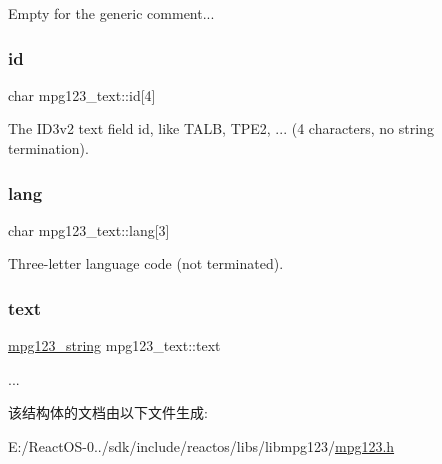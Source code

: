 Empty for the generic comment... \mbox{\label{structmpg123__text_a8a75ed97a1d8a019a3944935c1339fdb}} 
\subsubsection{\texorpdfstring{id}{id}}
{\footnotesize\ttfamily char mpg123\+\_\+text\+::id\mbox{[}4\mbox{]}}

The I\+D3v2 text field id, like T\+A\+LB, T\+P\+E2, ... (4 characters, no string termination). \mbox{\label{structmpg123__text_a19f010dbd07ec10efa80d909768372e6}} 
\subsubsection{\texorpdfstring{lang}{lang}}
{\footnotesize\ttfamily char mpg123\+\_\+text\+::lang\mbox{[}3\mbox{]}}

Three-\/letter language code (not terminated). \mbox{\label{structmpg123__text_a574b9464a996281f629858c0216eae18}} 
\subsubsection{\texorpdfstring{text}{text}}
{\footnotesize\ttfamily \hyperlink{structmpg123__string}{mpg123\+\_\+string} mpg123\+\_\+text\+::text}

... 

该结构体的文档由以下文件生成\+:\begin{DoxyCompactItemize}
\item 
E\+:/\+React\+O\+S-\/0../sdk/include/reactos/libs/libmpg123/\hyperlink{mpg123_8h}{mpg123.\+h}\end{DoxyCompactItemize}
